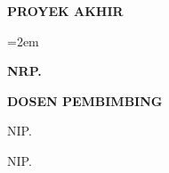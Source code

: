 \newpage
\thispagestyle{empty}

\begin{flushright}
  {\fontsize{20}{0}\bfseries\selectfont PROYEK AKHIR\par}
\end{flushright}

\vspace{1.5cm}

\begin{center}

  \begin{minipage}{1\textwidth}
    \centering
    {\emergencystretch=2em\fontsize{18}{22}\bfseries\selectfont\MakeUppercase{\JudulPA}}
  \end{minipage}
  \par

  \vspace{1.2cm}

  {\fontsize{16}{20}\bfseries\selectfont \NamaMahasiswa\par}
  {\fontsize{16}{20}\bfseries\selectfont NRP. \NRP\par}

  \vspace{0.8cm}

  {\fontsize{16}{20}\bfseries\selectfont DOSEN PEMBIMBING\par}
  \vspace{0.3cm}
  {\fontsize{16}{20}\selectfont \NamaPembimbingSatu\par}
  {\fontsize{16}{20}\selectfont NIP. \NIPPembimbingSatu\par}
  \vspace{0.3cm}
  {\fontsize{16}{20}\selectfont \NamaPembimbingDua\par}
  {\fontsize{16}{20}\selectfont NIP. \NIPPembimbingDua\par}



\end{center}
